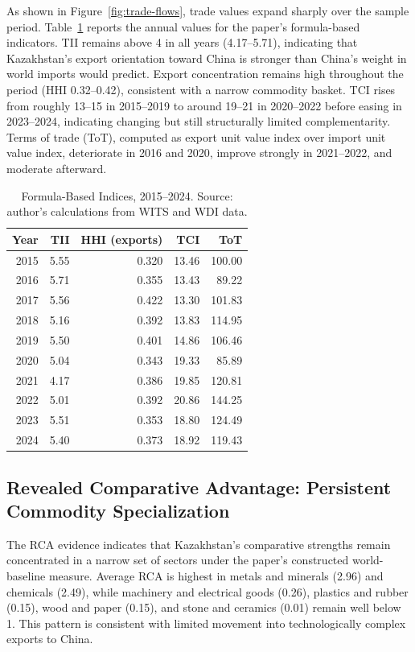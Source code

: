 \documentclass[12pt]{article}
\begin{document}
As shown in Figure~\ref{fig:trade-flows}, trade values expand sharply over the sample period. Table~\ref{tab:formula-indices} reports the annual values for the paper's formula-based indicators. TII remains above 4 in all years (4.17--5.71), indicating that Kazakhstan's export orientation toward China is stronger than China's weight in world imports would predict. Export concentration remains high throughout the period (HHI 0.32--0.42), consistent with a narrow commodity basket. TCI rises from roughly 13--15 in 2015--2019 to around 19--21 in 2020--2022 before easing in 2023--2024, indicating changing but still structurally limited complementarity. Terms of trade (ToT), computed as export unit value index over import unit value index, deteriorate in 2016 and 2020, improve strongly in 2021--2022, and moderate afterward.

\begin{table}[h]
\centering
\caption{Formula-Based Indices, 2015--2024. Source: author's calculations from WITS and WDI data.}
\label{tab:formula-indices}
\begin{tabular}{rrrrr}
\toprule
Year & TII & HHI (exports) & TCI & ToT \\
\midrule
2015 & 5.55 & 0.320 & 13.46 & 100.00 \\
2016 & 5.71 & 0.355 & 13.43 & 89.22 \\
2017 & 5.56 & 0.422 & 13.30 & 101.83 \\
2018 & 5.16 & 0.392 & 13.83 & 114.95 \\
2019 & 5.50 & 0.401 & 14.86 & 106.46 \\
2020 & 5.04 & 0.343 & 19.33 & 85.89 \\
2021 & 4.17 & 0.386 & 19.85 & 120.81 \\
2022 & 5.01 & 0.392 & 20.86 & 144.25 \\
2023 & 5.51 & 0.353 & 18.80 & 124.49 \\
2024 & 5.40 & 0.373 & 18.92 & 119.43 \\
\bottomrule
\end{tabular}
\end{table}

\subsection{Revealed Comparative Advantage: Persistent Commodity Specialization}

The RCA evidence indicates that Kazakhstan's comparative strengths remain concentrated in a narrow set of sectors under the paper's constructed world-baseline measure. Average RCA is highest in metals and minerals (2.96) and chemicals (2.49), while machinery and electrical goods (0.26), plastics and rubber (0.15), wood and paper (0.15), and stone and ceramics (0.01) remain well below 1. This pattern is consistent with limited movement into technologically complex exports to China.
\end{document}

